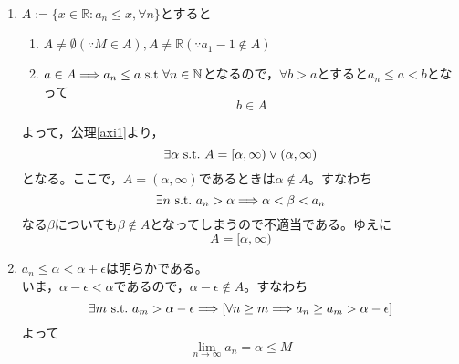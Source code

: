 \documentclass[dvipdfmx,a4j,10pt]{jsarticle}
\makeatletter
\theoremstyle{mystyle1}
\theoremstyle{mystyle2}
\renewenvironment{proof}[1][\proofname]{\par
  \pushQED{\qed}%
  \normalfont
  \topsep6\p@\@plus6\p@ \trivlist
  \item[\hskip\labelsep{\bfseries\sffamily #1}]\ignorespaces
}{%
  \popQED\endtrivlist\@endpefalse
}
\renewcommand\proofname{証明}
\makeatother
\begin{document}
\begin{proof}[定理\ref{thm1}の証明]\
    \begin{enumerate}
    \renewcommand{\labelenumi}{Step\arabic{enumi}.}
    	\item $A:=\{x\in\mathbb{R}:a_n\leq x,\forall n\}$とする\footnotemark  と
    		\begin{enumerate}
    		\renewcommand{\labelenumii}{\arabic{enumii}.}
    			\item $A\neq\emptyset (\because M\in A),A\neq\mathbb{R} (\because a_1-1\notin A)$
    			\item $a\in A\Longrightarrow a_n\leq a\ {\rm s.t \ }\forall n\in\mathbb{N}$となるので，$\forall b>a$とすると$a_n\leq a<b$となって
    				\[b\in A\]
    		\end{enumerate}
    		よって，公理\ref{axi1}より，
    		\[\exists\alpha\ {\rm s.t.\ }A=[\alpha,\infty)\lor(\alpha,\infty)\]
    		となる。ここで，$A=(\alpha,\infty)$であるときは$\alpha\notin A$。すなわち
    		\[\exists n\ {\rm s.t.\ }a_n>\alpha\Longrightarrow \alpha<\beta<a_n\]
    		なる$\beta$についても$\beta\notin A$となってしまうので不適当である。ゆえに
    		\[A=[\alpha,\infty)\]
    	\item\footnotemark  $a_n\leq\alpha<\alpha+\epsilon$は明らかである。\\
    		いま，$\alpha-\epsilon<\alpha$であるので，$\alpha-\epsilon\notin A$。すなわち
    		\[\exists m\ {\rm s.t.\ } a_m>\alpha-\epsilon\Longrightarrow[\forall n\geq m\Longrightarrow a_n\geq a_m>\alpha-\epsilon]\]
    		よって
    		\[\lim_{n\to\infty}a_n=\alpha\leq M\]
    \end{enumerate}
\end{proof}

\end{document}
